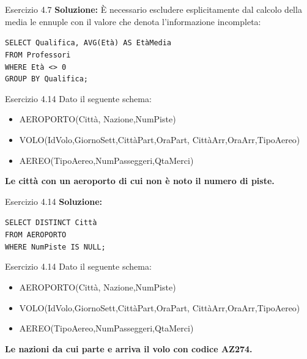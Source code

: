 \begin{frame}{Esercizio 4.7}
    \textbf{Soluzione:}
    \`E necessario escludere esplicitamente dal calcolo della media le ennuple con il valore che denota l'informazione incompleta:
    \vspace{1em}
    
    \texttt{SELECT Qualifica, AVG(Et\`a) AS Et\`aMedia\\FROM Professori\\WHERE Et\`a <> 0\\GROUP BY Qualifica;}
\end{frame}
\begin{frame}{Esercizio 4.14}
    Dato il seguente schema:
    \begin{itemize}
        \item AEROPORTO(Citt\`a, Nazione,NumPiste)
        \item VOLO(IdVolo,GiornoSett,Citt\`aPart,OraPart,
        Citt\`aArr,OraArr,TipoAereo)
        \item AEREO(TipoAereo,NumPasseggeri,QtaMerci)
    \end{itemize}
    \vspace{1em}
    
    \textbf{Le citt\`a con un aeroporto di cui non \`e noto il numero di piste.}
\end{frame}

\begin{frame}{Esercizio 4.14}
    \textbf{Soluzione:}
    \vspace{1em}
    
    \texttt{SELECT DISTINCT Citt\`a\\FROM AEROPORTO\\WHERE NumPiste IS NULL;}
    \end{frame}
\begin{frame}{Esercizio 4.14}
    Dato il seguente schema:
    \begin{itemize}
        \item AEROPORTO(Citt\`a, Nazione,NumPiste)
        \item VOLO(IdVolo,GiornoSett,Citt\`aPart,OraPart,
        Citt\`aArr,OraArr,TipoAereo)
        \item AEREO(TipoAereo,NumPasseggeri,QtaMerci)
    \end{itemize}
    \vspace{1em}
    
    \textbf{Le nazioni da cui parte e arriva il volo con codice AZ274.}
\end{frame}

